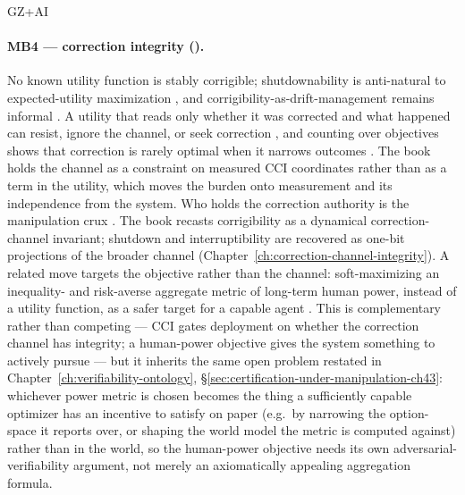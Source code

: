 \begin{authbar}{GZ+AI}
\paragraph{MB4 --- correction integrity ().}
No known utility function is stably corrigible; shutdownability is anti-natural to expected-utility maximization \autocite{soares2015corrigibility,orseau2016interruptible}, and corrigibility-as-drift-management remains informal \autocite{christiano2018corrigibility}.
A utility that reads only whether it was corrected and what happened can resist, ignore the channel, or seek correction \autocite{soares2015corrigibility,turner2021corrigibilityvnm}, and counting over objectives shows that correction is rarely optimal when it narrows outcomes \autocite{turner2021seekpower,turner2022retargetable}.
The book holds the channel as a constraint on measured CCI coordinates rather than as a term in the utility, which moves the burden onto measurement and its independence from the system.
Who holds the correction authority is the manipulation crux \autocite{yudkowsky2004cev}.
The book recasts corrigibility as a dynamical correction-channel invariant; shutdown and interruptibility are recovered as one-bit projections of the broader channel (Chapter~\ref{ch:correction-channel-integrity}).
A related move targets the objective rather than the channel: soft-maximizing an inequality- and risk-averse aggregate metric of long-term human power, instead of a utility function, as a safer target for a capable agent \autocite{heitzig2025humanpower}.
This is complementary rather than competing --- CCI gates deployment on whether the correction channel has integrity; a human-power objective gives the system something to actively pursue --- but it inherits the same open problem restated in Chapter~\ref{ch:verifiability-ontology}, \S\ref{sec:certification-under-manipulation-ch43}: whichever power metric is chosen becomes the thing a sufficiently capable optimizer has an incentive to satisfy on paper (e.g.\ by narrowing the option-space it reports over, or shaping the world model the metric is computed against) rather than in the world, so the human-power objective needs its own adversarial-verifiability argument, not merely an axiomatically appealing aggregation formula.


\end{authbar}
